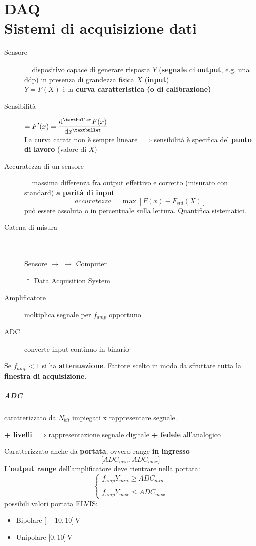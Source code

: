 \documentclass[10pt, oneside]{book}
\newcommand{\imp}{$\implies$}
\newcommand{\casess}[2]{
\begin{cases} 
\displaystyle #1 \\ \\ 
\displaystyle #2
\end{cases}
}
\begin{document}
\chapter{DAQ\\Sistemi di acquisizione dati}
\begin{description}
\item[Sensore] = dispositivo capace di generare risposta $Y$ (\textbf{segnale} di \textbf{output}, e.g. una ddp) in presenza di grandezza fisica $X$ (\textbf{input})\\
$Y = F(X)$ è la \textbf{curva caratteristica (o di calibrazione)}
\item[Sensibilità] $\displaystyle = F'(x) = \dv[•]{F(x)}{x}$\\
La curva caratt non è sempre lineare \imp sensibilità è specifica del \textbf{punto di lavoro} (valore di $X$)
\item[Accuratezza di un sensore] = massima differenza fra output effettivo e corretto (misurato con standard) \textbf{a parità di input}
\[accuratezza = \max[F(x) - F_{std}(X)]\] 
può essere assoluta o in percentuale sulla lettura. Quantifica sistematici.
\item[Catena di misura]{}\,\\~\\
Sensore $\longrightarrow$  $\longrightarrow$ Computer \begin{center} $\uparrow$ Data Acquisition System\end{center}
\item[Amplificatore] moltiplica segnale per $f_{amp}$ opportuno
\item[ADC] converte input continuo in binario
\end{description}
Se $f_{amp} < 1$ si ha \textbf{attenuazione}. Fattore scelto in modo da sfruttare tutta la \textbf{finestra di acquisizione}.

\paragraph{ADC} caratterizzato da $N_{bit}$ impiegati x rappresentare segnale.
\begin{center}
\textbf{+ livelli} \imp rappresentazione segnale digitale \textbf{+ fedele} all'analogico
\end{center}
Caratterizzato anche da \textbf{portata}, ovvero range \textbf{in ingresso}
\[\big[ADC_{min}, ADC_{max}\big]\]
L'\textbf{output range} dell'amplificatore deve rientrare nella portata:
\[\casess{f_{amp} Y_{min} \geq ADC_{min}}{f_{amp} Y_{max} \leq ADC_{max}}\]
possibili valori portata ELVIS:
\begin{itemize}
\item Bipolare $\big[ -10, 10 \big] \, \mathrm{V}$
\item Unipolare $\big[ 0, 10 \big] \, \mathrm{V}$
\end{itemize}
\end{document}
